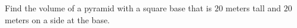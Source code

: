 \documentclass{ximera}
\begin{document}
\begin{example}
Find the volume of a pyramid with a square base that is $20$ meters tall
and $20$ meters on a side at the base. 



 







 


\end{example}
\end{document}
